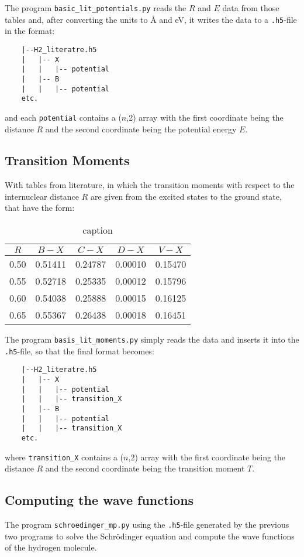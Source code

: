 The program \texttt{basic\_lit\_potentials.py} reads the $R$ and  $E$ data from those tables and, after converting the units to \si{\angstrom} and \si{\eV}, it writes the data to a \texttt{.h5}-file in the format:

\begin{verbatim}
    |--H2_literatre.h5
    |   |-- X
    |   |   |-- potential
    |   |-- B
    |   |   |-- potential
    etc.
\end{verbatim}
and each \texttt{potential} contains a ($n$,2) array with the first coordinate being the distance $R$ and the second coordinate being the potential energy $E$.

\subsection{Transition Moments}
With tables from literature, in which the transition moments with respect to the internuclear distance $R$ are given from the excited states to the ground state, that have the form:
\begin{table}[htpb]
    \centering
    \caption{caption}
    \label{tab:label}
    \begin{tabular}{c|c|c|c|c}
        $R$    &     $B - X$    &   $C - X$    &   $D - X$  &   $V - X$    \\ 
        \hline
        0.50 & 0.51411 & 0.24787 & 0.00010 & 0.15470\\
        0.55 & 0.52718 & 0.25335 & 0.00012 & 0.15796 \\
        0.60 & 0.54038 & 0.25888 & 0.00015 & 0.16125 \\
        0.65 & 0.55367 & 0.26438 & 0.00018 & 0.16451 \\
    \end{tabular}
\end{table}
The program \texttt{basis\_lit\_moments.py} simply reads the data and inserts it into the \texttt{.h5}-file, so that the final format becomes:
\begin{verbatim}
    |--H2_literatre.h5
    |   |-- X
    |   |   |-- potential
    |   |   |-- transition_X
    |   |-- B
    |   |   |-- potential
    |   |   |-- transition_X
    etc.
\end{verbatim}

where \texttt{transition\_X} contains a ($n$,2) array with the first coordinate being the distance $R$ and the second coordinate being the transition moment $T$.

\subsection{Computing the wave functions}
The program \texttt{schroedinger\_mp.py} using the \texttt{.h5}-file generated by the previous two programs to solve the Schrödinger equation and compute the wave functions of the hydrogen molecule.

